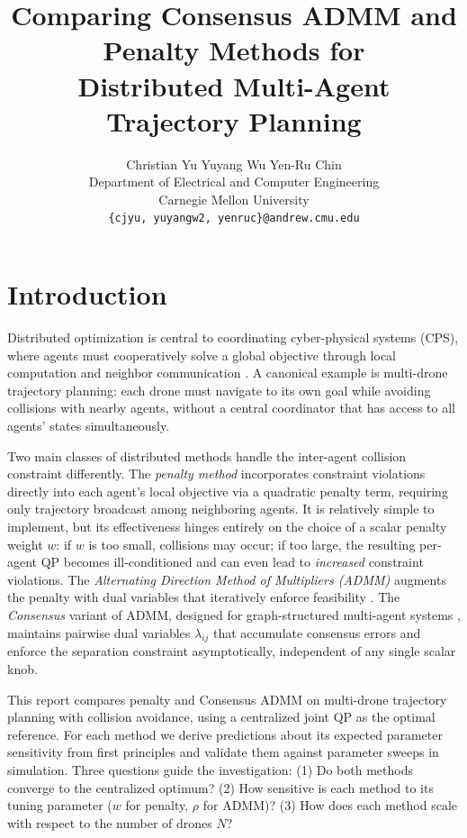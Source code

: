 \documentclass[11pt,onecolumn]{article}
\title{\textbf{Comparing Consensus ADMM and Penalty Methods for\\
Distributed Multi-Agent Trajectory Planning}}
\author{Christian Yu \quad Yuyang Wu \quad Yen-Ru Chin \\[0.3em]
\small Department of Electrical and Computer Engineering \\
\small Carnegie Mellon University \\
\small \texttt{\{cjyu, yuyangw2, yenruc\}@andrew.cmu.edu}}
\date{}
\begin{document}
\maketitle
\thispagestyle{empty}

\section{Introduction}
\label{sec:intro}

Distributed optimization is central to coordinating cyber-physical systems (CPS), where
agents must cooperatively solve a global objective through local computation and neighbor
communication \cite{notarstefano2019}.  A canonical example is multi-drone
trajectory planning: each drone must navigate to its own goal while avoiding collisions with
nearby agents, without a central coordinator that has access to all agents' states simultaneously.

Two main classes of distributed methods handle the inter-agent collision constraint
differently.  The \emph{penalty method} incorporates constraint violations directly into each agent’s local objective via a quadratic penalty term, requiring only trajectory broadcast among neighboring agents.  It is relatively simple to implement, but its effectiveness hinges entirely on the choice of a scalar penalty weight $w$: if $w$ is too small, collisions may occur; if too large, the resulting per-agent QP becomes ill-conditioned and can even lead to \emph{increased} constraint violations.
The \emph{Alternating Direction Method of Multipliers (ADMM)} augments the penalty with
dual variables that iteratively enforce feasibility \cite{boyd2011admm}.
The \emph{Consensus} variant of ADMM, designed for graph-structured multi-agent systems \cite{chen2024tutorial}, maintains pairwise dual variables $\lambda_{ij}$
that accumulate consensus errors and enforce the separation constraint asymptotically,
independent of any single scalar knob.

This report compares penalty and Consensus ADMM on multi-drone trajectory planning with
collision avoidance, using a centralized joint QP as the optimal reference.  For each
method we derive predictions about its expected parameter sensitivity from first principles and
validate them against parameter sweeps in simulation.  Three questions guide the
investigation: (1) Do both methods converge to the centralized optimum?  (2) How
sensitive is each method to its tuning parameter ($w$ for penalty, $\rho$ for ADMM)?
(3) How does each method scale with respect to the number of drones $N$?
\end{document}
